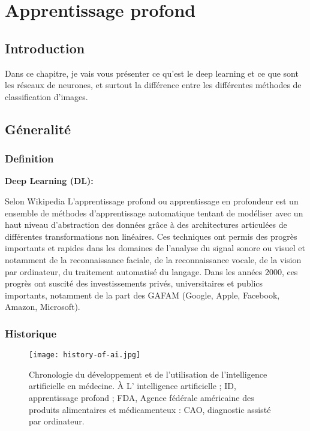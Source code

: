 \chapter{Apprentissage profond}

\section*{Introduction}
    Dans ce chapitre, je vais vous présenter ce qu'est le deep learning et ce que sont les réseaux de neurones, et surtout la différence entre les différentes méthodes de classification d'images.
\section{Géneralité}
    \subsection{Definition}\textbf{Deep Learning (DL):} 
            
        Selon Wikipedia L'apprentissage profond ou apprentissage en profondeur est un ensemble de méthodes d'apprentissage automatique tentant de modéliser avec un haut niveau d’abstraction des données grâce à des architectures articulées de différentes transformations non linéaires. Ces techniques ont permis des progrès importants et rapides dans les domaines de l'analyse du signal sonore ou visuel et notamment de la reconnaissance faciale, de la reconnaissance vocale, de la vision par ordinateur, du traitement automatisé du langage. Dans les années 2000, ces progrès ont suscité des investissements privés, universitaires et publics importants, notamment de la part des GAFAM (Google, Apple, Facebook, Amazon, Microsoft).
    \subsection{Historique}

    \begin{figure}[H]
        \centering
        \texttt{[image: history-of-ai.jpg]}
        \caption{Chronologie du développement et de l'utilisation de l'intelligence artificielle en médecine. 
        À L' intelligence artificielle ; ID, apprentissage profond ; FDA, Agence fédérale américaine des produits alimentaires et médicamenteux  : CAO, diagnostic assisté par ordinateur.
        }
        \label{fig:history-of-ai}
    \end{figure}

